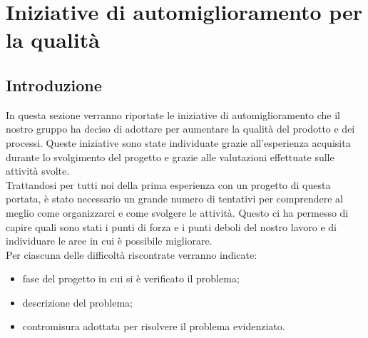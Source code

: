 \section{Iniziative di automiglioramento per la qualità}
\subsection{Introduzione}
In questa sezione verranno riportate le iniziative di automiglioramento che il nostro gruppo ha deciso di adottare per 
aumentare la qualità del prodotto e dei processi. Queste iniziative sono state individuate grazie all'esperienza acquisita 
durante lo svolgimento del progetto e grazie alle valutazioni effettuate sulle attività svolte. \\
Trattandosi per tutti noi della prima esperienza con un progetto di questa portata, 
è stato necessario un grande numero di tentativi per comprendere al meglio come organizzarci e come svolgere le attività.
Questo ci ha permesso di capire quali sono stati i punti di forza e i punti deboli del nostro lavoro e di individuare le aree 
in cui è possibile migliorare. \\
Per ciascuna delle difficoltà riscontrate verranno indicate:
\begin{itemize}
    \item fase del progetto in cui si è verificato il problema;
    \item descrizione del problema;
    \item contromisura adottata per risolvere il problema evidenziato.
\end{itemize}

